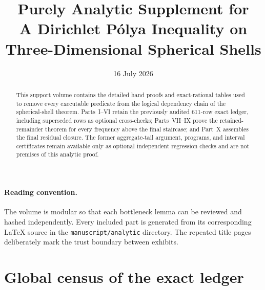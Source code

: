 \documentclass[11pt]{article}
\title{Purely Analytic Supplement for\\
A Dirichlet P\'olya Inequality on\\
Three-Dimensional Spherical Shells}
\author{}
\date{16 July 2026}
\begin{document}
\maketitle

\begin{abstract}
This support volume contains the detailed hand proofs and exact-rational
tables used to remove every executable predicate from the logical dependency
chain of the spherical-shell theorem. Parts~I--VI retain the previously
audited 611-row exact ledger, including superseded rows as optional
cross-checks; Parts~VII--IX prove the retained-remainder theorem for every
frequency above the final staircase; and Part~X assembles the final residual
closure. The former aggregate-tail argument, programs, and interval
certificates remain available only as optional independent regression checks
and are not premises of this analytic proof.
\end{abstract}

\paragraph{Reading convention.}
The volume is modular so that each bottleneck lemma can be reviewed and
hashed independently. Every included part is generated from its corresponding
LaTeX source in the \texttt{manuscript/analytic} directory. The repeated title
pages deliberately mark the trust boundary between exhibits.

\section*{Global census of the exact ledger}
\end{document}
